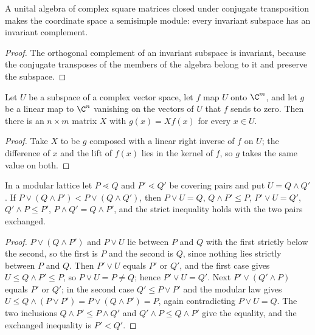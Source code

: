 \begin{lemma}
    \label{lem:wordflags_star_closed_semisimple}
    \leanok
    A unital algebra of complex square matrices closed under conjugate
    transposition makes the coordinate space a semisimple module: every
    invariant subspace has an invariant complement.
\end{lemma}

\begin{proof}
    \leanok
    The orthogonal complement of an invariant subspace is invariant, because
    the conjugate transposes of the members of the algebra belong to it and
    preserve the subspace.
\end{proof}

\begin{lemma}
    \label{lem:wordflags_subspace_factorization}
    \leanok
    Let $U$ be a subspace of a complex vector space, let $f$ map $U$ onto
    $\C^m$, and let $g$ be a linear map to $\C^n$ vanishing on the vectors of
    $U$ that $f$ sends to zero. Then there is an $n\times m$ matrix $X$ with
    $g(x)=Xf(x)$ for every $x\in U$.
\end{lemma}

\begin{proof}
    \leanok
    Take $X$ to be $g$ composed with a linear right inverse of $f$ on $U$;
    the difference of $x$ and the lift of $f(x)$ lies in the kernel of $f$,
    so $g$ takes the same value on both.
\end{proof}

\begin{lemma}
    \label{lem:asym_uniq_step}
    \leanok
    In a modular lattice let $P\lessdot Q$ and $P'\lessdot Q'$ be covering
    pairs and put $U=Q\wedge Q'$. If $P\vee(Q\wedge P')<P\vee(Q\wedge Q')$,
    then $P\vee U=Q$, $Q\wedge P'\leq P$, $P'\vee U=Q'$,
    $Q'\wedge P\leq P'$, $P\wedge Q'=Q\wedge P'$, and the strict inequality
    holds with the two pairs exchanged.
\end{lemma}

\begin{proof}
    \leanok
    $P\vee(Q\wedge P')$ and $P\vee U$ lie between $P$ and $Q$ with the first
    strictly below the second, so the first is $P$ and the second is $Q$,
    since nothing lies strictly between $P$ and $Q$. Then $P'\vee U$ equals
    $P'$ or $Q'$, and the first case gives $U\leq Q\wedge P'\leq P$, so
    $P\vee U=P\neq Q$; hence $P'\vee U=Q'$. Next $P'\vee(Q'\wedge P)$ equals
    $P'$ or $Q'$; in the second case $Q'\leq P\vee P'$ and the modular law
    gives $U\leq Q\wedge(P\vee P')=P\vee(Q\wedge P')=P$, again contradicting
    $P\vee U=Q$. The two inclusions $Q\wedge P'\leq P\wedge Q'$ and
    $Q'\wedge P\leq Q\wedge P'$ give the equality, and the exchanged
    inequality is $P'<Q'$.
\end{proof}

